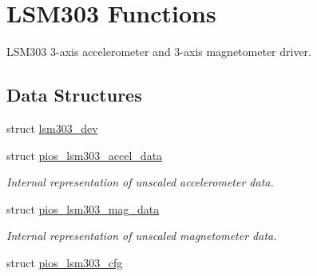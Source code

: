 \hypertarget{group___p_i_o_s___l_s_m303}{\section{\-L\-S\-M303 \-Functions}
\label{group___p_i_o_s___l_s_m303}
}


\-L\-S\-M303 3-\/axis accelerometer and 3-\/axis magnetometer driver.  


\subsection*{\-Data \-Structures}
\begin{DoxyCompactItemize}
\item 
struct \hyperlink{structlsm303__dev}{lsm303\-\_\-dev}
\item 
struct \hyperlink{structpios__lsm303__accel__data}{pios\-\_\-lsm303\-\_\-accel\-\_\-data}
\begin{DoxyCompactList}\small\item\em \-Internal representation of unscaled accelerometer data. \end{DoxyCompactList}\item 
struct \hyperlink{structpios__lsm303__mag__data}{pios\-\_\-lsm303\-\_\-mag\-\_\-data}
\begin{DoxyCompactList}\small\item\em \-Internal representation of unscaled magnetometer data. \end{DoxyCompactList}\item 
struct \hyperlink{structpios__lsm303__cfg}{pios\-\_\-lsm303\-\_\-cfg}
\end{DoxyCompactItemize}
